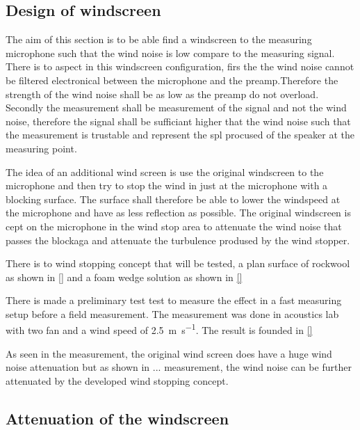 \subsection{Design of windscreen}
The aim of this section is to be able find a windscreen to the measuring microphone such that the wind noise is low compare to the measuring signal. There is to aspect in this windscreen configuration, firs the the wind noise cannot be filtered electronical between the microphone and the preamp.Therefore the strength of the wind noise shall be as low as the preamp do not overload. Secondly the measurement shall be measurement of the signal and not the wind noise, therefore the signal shall be sufficiant higher that the wind noise such that the measurement is trustable and represent the \gls{spl} procused of the speaker at the measuring point. 

The idea of an additional wind screen is use the original windscreen to the microphone and then try to stop the wind in just at the microphone with a blocking surface. The surface shall therefore be able to lower the windspeed at the microphone and have as less reflection as possible. The original windscreen is cept on the microphone in the wind stop area to attenuate the wind noise that passes the blockaga and attenuate the turbulence prodused by the wind stopper. 

There is to wind stopping concept that will be tested, a plan surface of rockwool as shown in \autoref{} and a foam wedge solution as shown in \autoref{}
    

There is made a preliminary test test to measure the effect in a fast measuring setup before a field measurement. The measurement was done in acoustics lab with two fan and a wind speed of \SI{2.5}{\meter\per\second}. The result is founded in \autoref{}



As seen in the measurement, the original wind screen does have a huge wind noise attenuation but as shown in ... measurement, the wind noise can be further attenuated by the developed wind stopping concept. 




\subsection{Attenuation of the windscreen} 

